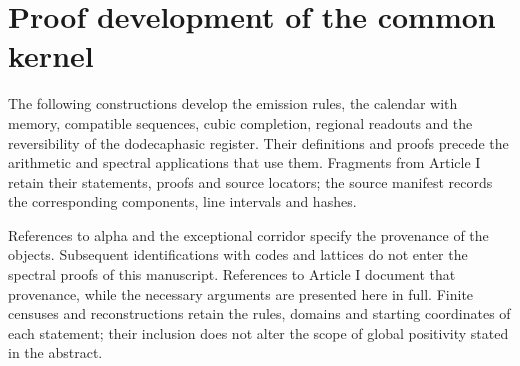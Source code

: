 \section*{Proof development of the common kernel}

The following constructions develop the emission rules, the calendar with
memory, compatible sequences, cubic completion, regional readouts and the
reversibility of the dodecaphasic register. Their definitions and proofs precede
the arithmetic and spectral applications that use them. Fragments from Article I
retain their statements, proofs and source locators; the source manifest records
the corresponding components, line intervals and hashes.

References to alpha and the exceptional corridor specify the provenance of the
objects. Subsequent identifications with codes and lattices do not enter the
spectral proofs of this manuscript. References to Article I document that
provenance, while the necessary arguments are presented here in full. Finite
censuses and reconstructions retain the rules, domains and starting coordinates
of each statement; their inclusion does not alter the scope of global positivity
stated in the abstract.

\clearpage




\clearpage


\clearpage
\clearpage


\clearpage


\clearpage

